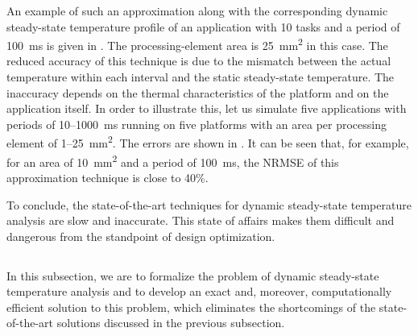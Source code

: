An example of such an approximation along with the corresponding dynamic
steady-state temperature profile of an application with 10 tasks and a period of
100~ms is given in . The
processing-element area is 25~mm\textsuperscript{2} in this case. The reduced
accuracy of this technique is due to the mismatch between the actual temperature
within each interval and the static steady-state temperature. The inaccuracy
depends on the thermal characteristics of the platform and on the application
itself. In order to illustrate this, let us simulate five applications with
periods of 10--1000~ms running on five platforms with an area per processing
element of 1--25~mm\textsuperscript{2}. The errors are shown in
. It can be seen that, for example, for an
area of 10~mm\textsuperscript{2} and a period of 100~ms, the \ac{NRMSE} of this
approximation technique is close to 40\%.

To conclude, the state-of-the-art techniques for dynamic steady-state
temperature analysis are slow and inaccurate. This state of affairs makes them
difficult and dangerous from the standpoint of design optimization.

\subsection{\solutiontitle}

In this subsection, we are to formalize the problem of dynamic steady-state
temperature analysis and to develop an exact and, moreover, computationally
efficient solution to this problem, which eliminates the shortcomings of the
state-of-the-art solutions discussed in the previous subsection.

